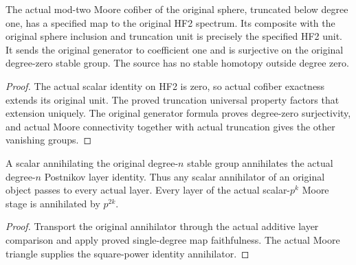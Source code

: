\begin{proposition}
  \label{prop:actual-mod-two-moore-heart-comparison}
  \leanok
  The actual mod-two Moore cofiber of the original sphere, truncated below degree one, has a specified map to the original HF2 spectrum. Its composite with the original sphere inclusion and truncation unit is precisely the specified HF2 unit. It sends the original generator to coefficient one and is surjective on the original degree-zero stable group. The source has no stable homotopy outside degree zero.
\end{proposition}
\begin{proof}
  The actual scalar identity on HF2 is zero, so actual cofiber exactness extends its original unit. The proved truncation universal property factors that extension uniquely. The original generator formula proves degree-zero surjectivity, and actual Moore connectivity together with actual truncation gives the other vanishing groups.
  \leanok
\end{proof}

\begin{proposition}
  \label{prop:actual-postnikov-scalar-annihilation}
  \leanok
  A scalar annihilating the original degree-$n$ stable group annihilates the actual degree-$n$ Postnikov layer identity. Thus any scalar annihilator of an original object passes to every actual layer. Every layer of the actual scalar-$p^k$ Moore stage is annihilated by $p^{2k}$.
\end{proposition}
\begin{proof}
  Transport the original annihilator through the actual additive layer comparison and apply proved single-degree map faithfulness. The actual Moore triangle supplies the square-power identity annihilator.
  \leanok
\end{proof}

